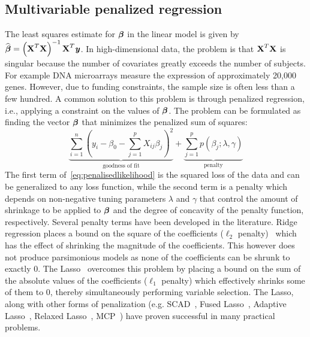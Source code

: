 \subsection{Multivariable penalized regression} \label{sec:pen}
The least squares estimate for $\boldsymbol{\beta}$ in the linear model is given by $ \widehat{\boldsymbol{\beta}} = \left( \textbf{X}^T \textbf{X}  \right)^{-1} \textbf{X}^T \textbf{\emph{y}} $. In high-dimensional data, the problem is that $\textbf{X}^T \textbf{X}$ is singular because the number of covariates greatly exceeds the number of subjects. 
For example DNA microarrays measure the expression of approximately 20,000 genes. 
However, due to funding constraints, the sample size is often less than a few hundred. 
A common solution to this problem is through penalized regression, i.e., applying a constraint on the values of $\boldsymbol{\beta}$. The problem can be formulated as finding the vector $\boldsymbol{\beta}$ that minimizes the penalized sum of squares:
\begin{equation}
\underbrace{\sum\limits_{i=1}^{n} \left( y_i - \beta_0 - \sum\limits_{j=1}^{p}X_{ij}\beta_j \right)^2}_{\textrm{goodness of fit}} +  \underbrace{\sum\limits_{j=1}^{p} p(\beta_j;\lambda, \gamma)}_{\textrm{penalty}} \label{eq:penalisedlikelihood}
\end{equation}
The first term of~\eqref{eq:penalisedlikelihood} is the squared loss of the data and can be generalized to any loss function, while the second term is a penalty which depends on non-negative tuning parameters $\lambda$ and $\gamma$ that control the amount of shrinkage to be applied to $\boldsymbol{\beta}$ and the degree of concavity of the penalty function, respectively. 
Several penalty terms have been developed in the literature. Ridge regression places a bound on the square of the coefficients ($\ell_2$ penalty)~\citep{hoerl1970ridge} which has the effect of shrinking the magnitude of the coefficients. 
This however does not produce parsimonious models as none of the coefficients can be shrunk to exactly 0. The Lasso~\citep{tibshirani1996regression} overcomes this problem by placing a bound on the sum of the absolute values of the coefficients ($\ell_1$ penalty) which effectively shrinks some of them to 0, thereby simultaneously performing variable selection. The Lasso, along with other forms of penalization (e.g. SCAD~\cite{fan2001variable}, Fused Lasso~\citep{tibshirani2005sparsity}, Adaptive Lasso~\citep{zou2006adaptive}, Relaxed Lasso~\citep{meinshausen2007relaxed}, MCP~\citep{zhang2010nearly}) have proven successful in many practical problems.
